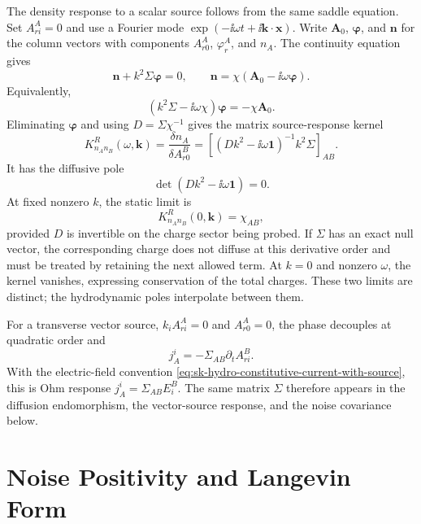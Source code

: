 The density response to a scalar source follows from the same saddle
equation.  Set \(A^A_{ri}=0\) and use a Fourier mode
\(\exp(-\ii\omega t+\ii\mathbf k\cdot\mathbf x)\).  Write
\(\mathbf A_0\), \(\boldsymbol\varphi\), and \(\mathbf n\) for the column
vectors with components \(A^A_{r0}\), \(\varphi^A_r\), and \(n_A\).  The
continuity equation gives
\[
  \mathbf n+k^2\Sigma\boldsymbol\varphi=0,
  \qquad
  \mathbf n=\chi(\mathbf A_0-\ii\omega\boldsymbol\varphi).
\]
Equivalently,
\[
  (k^2\Sigma-\ii\omega\chi)\boldsymbol\varphi=-\chi\mathbf A_0 .
\]
Eliminating \(\boldsymbol\varphi\) and using \(D=\Sigma\chi^{-1}\) gives
the matrix source-response kernel
\begin{equation}
  K^R_{n_An_B}(\omega,\mathbf k)
  =
  \frac{\delta n_A}{\delta A^B_{r0}}
  =
  \left[
    (Dk^2-\ii\omega\mathbf 1)^{-1}k^2\Sigma
  \right]_{AB}.
  \label{eq:sk-hydro-density-response-kernel}
\end{equation}
It has the diffusive pole
\begin{equation}
  \det(Dk^2-\ii\omega\mathbf 1)=0 .
  \label{eq:sk-hydro-density-response-pole}
\end{equation}
At fixed nonzero \(k\), the static limit is
\[
  K^R_{n_An_B}(0,\mathbf k)=\chi_{AB},
\]
provided \(D\) is invertible on the charge sector being probed.  If
\(\Sigma\) has an exact null vector, the corresponding charge does not
diffuse at this derivative order and must be treated by retaining the next
allowed term.  At \(k=0\) and nonzero \(\omega\), the kernel vanishes,
expressing conservation of the total charges.  These two limits are
distinct; the hydrodynamic poles interpolate between them.

For a transverse vector source, \(k_iA^A_{ri}=0\) and \(A^A_{r0}=0\), the
phase decouples at quadratic order and
\[
  j_A^i=-\Sigma_{AB}\partial_tA^B_{ri}.
\]
With the electric-field convention
\eqref{eq:sk-hydro-constitutive-current-with-source}, this is Ohm response
\(j_A^i=\Sigma_{AB}E^B_i\).  The same matrix \(\Sigma\) therefore appears in
the diffusion endomorphism, the vector-source response, and the noise
covariance below.

\section{Noise Positivity and Langevin Form}

